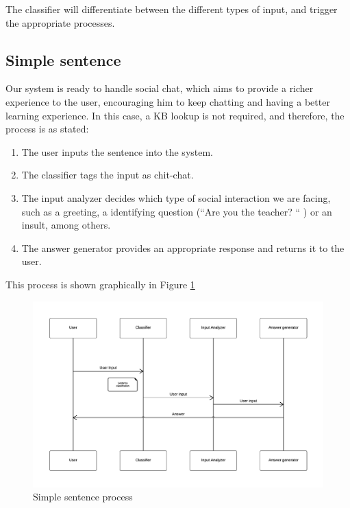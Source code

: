 
The classifier will differentiate between the different types of input, and trigger the appropriate processes.

\subsection{Simple sentence}

Our system is ready to handle social chat, which aims to provide a richer experience to the user, encouraging him to keep chatting and having a better learning experience. In this case, a \ac{KB} lookup is not required, and therefore, the process is as stated:

\begin{enumerate}
 \item The user inputs the sentence into the system.
 \item The classifier tags the input as chit-chat.
 \item The input analyzer decides which type of social interaction we are facing, such as a greeting, a identifying question (``Are you the teacher? `` ) or an insult, among others.
 \item The answer generator provides an appropriate response and returns it to the user.
\end{enumerate}

This process is shown graphically in Figure \ref{fig:arch2}

\begin{figure}[!htbp]
    \centering
    \includegraphics[width=\textwidth]{img/arch/SimpleSentence.png}
    \caption{Simple sentence process}
    \label{fig:arch2}
\end{figure}

